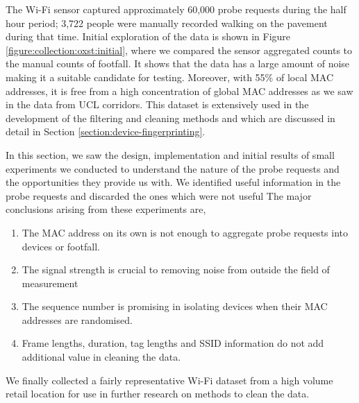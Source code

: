 The Wi-Fi sensor captured approximately 60,000 probe requests during the half hour period; 3,722 people were manually recorded walking on the pavement during that time.
Initial exploration of the data is shown in Figure \ref{figure:collection:oxst:initial}, where we compared the sensor aggregated counts to the manual counts of footfall.
It shows that the data has a large amount of noise making it a suitable candidate for testing. 
Moreover, with 55\% of local MAC addresses, it is free from a high concentration of global MAC addresses as we saw in the data from UCL corridors.
This dataset is extensively used in the development of the filtering and cleaning methods and which are discussed in detail in Section \ref{section:device-fingerprinting}.

In this section, we saw the design, implementation and initial results of small experiments we conducted to understand the nature of the probe requests and the opportunities they provide us with.
We identified useful information in the probe requests and discarded the ones which were not useful
The major conclusions arising from these experiments are,

\begin{enumerate}[rightmargin = 2em, leftmargin = 2em]
  \itemsep-0.25em
  \item The MAC address on its own is not enough to aggregate probe requests into devices or footfall.
  \item The signal strength is crucial to removing noise from outside the field of measurement
  \item The sequence number is promising in isolating devices when their MAC addresses are randomised.
  \item Frame lengths, duration, tag lengths and SSID information do not add additional value in cleaning the data.
\end{enumerate}

We finally collected a fairly representative Wi-Fi dataset from a high volume retail location for use in further research on methods to clean the data.

